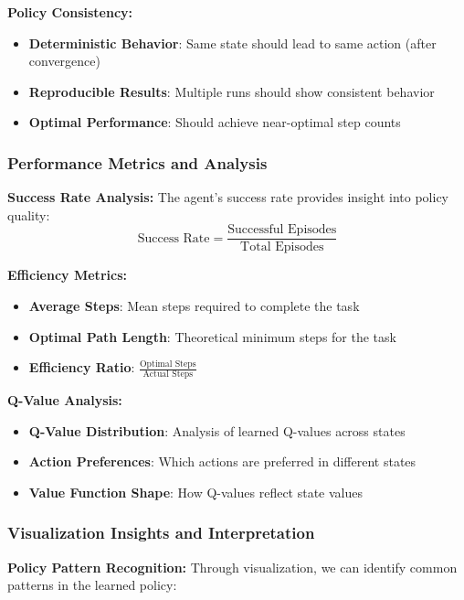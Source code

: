 \documentclass[12pt]{article}
\begin{document}
{{{\textbf{Policy Consistency:}
\begin{itemize}
    \item \textbf{Deterministic Behavior}: Same state should lead to same action (after convergence)
    \item \textbf{Reproducible Results}: Multiple runs should show consistent behavior
    \item \textbf{Optimal Performance}: Should achieve near-optimal step counts
\end{itemize}

\subsubsection{Performance Metrics and Analysis}

\textbf{Success Rate Analysis:}
The agent's success rate provides insight into policy quality:
\begin{equation}
\text{Success Rate} = \frac{\text{Successful Episodes}}{\text{Total Episodes}}
\end{equation}

\textbf{Efficiency Metrics:}
\begin{itemize}
    \item \textbf{Average Steps}: Mean steps required to complete the task
    \item \textbf{Optimal Path Length}: Theoretical minimum steps for the task
    \item \textbf{Efficiency Ratio}: $\frac{\text{Optimal Steps}}{\text{Actual Steps}}$
\end{itemize}

\textbf{Q-Value Analysis:}
\begin{itemize}
    \item \textbf{Q-Value Distribution}: Analysis of learned Q-values across states
    \item \textbf{Action Preferences}: Which actions are preferred in different states
    \item \textbf{Value Function Shape}: How Q-values reflect state values
\end{itemize}

\subsubsection{Visualization Insights and Interpretation}

\textbf{Policy Pattern Recognition:}
Through visualization, we can identify common patterns in the learned policy:

}}}
\end{document}
